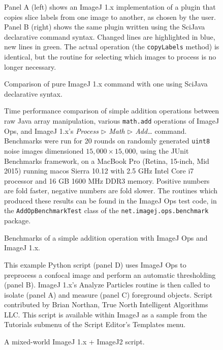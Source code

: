 \documentclass{bmcart}
\begin{document}
\begin{backmatter}
  \begin{figure}[h!]
    \caption{Comparison of pure ImageJ 1.x command with one using SciJava
    declarative syntax.}
    \begin{flushleft}
      Panel A (left) shows an ImageJ 1.x implementation of a plugin that copies
      slice labels from one image to another, as chosen by the user. Panel B
      (right) shows the same plugin written using the SciJava declarative
      command syntax. Changed lines are highlighted in blue, new lines in
      green. The actual operation (the \texttt{copyLabels} method) is
      identical, but the routine for selecting which images to process is no
      longer necessary.
    \end{flushleft}
  \end{figure}

  \begin{figure}[h!]
    \caption{Benchmarks of a simple addition operation with ImageJ Ops and
    ImageJ 1.x.}
    \begin{flushleft}
      Time performance comparison of simple addition operations between raw
      Java array manipulation, various \texttt{math.add} operations of ImageJ
      Ops, and ImageJ 1.x's \textit{Process $\triangleright$ Math
      $\triangleright$ Add\ldots} command. Benchmarks were run for 20 rounds on
      randomly generated \texttt{uint8} noise images dimensioned $15,000 \times
      15,000$, using the JUnit Benchmarks framework, on a MacBook Pro (Retina,
      15-inch, Mid 2015) running \acrshort{macos} Sierra 10.12 with 2.5 GHz
      Intel Core i7 processor and 16 GB 1600 MHz DDR3 memory. Positive numbers
      are fold faster, negative numbers are fold slower. The routines which
      produced these results can be found in the ImageJ Ops test code, in the
      \texttt{AddOpBenchmarkTest} class of the
      \texttt{net.imagej.ops.benchmark} package.
    \end{flushleft}
  \end{figure}

  \begin{figure}[h!]
    \caption{A mixed-world ImageJ 1.x + ImageJ2 script.}
    \begin{flushleft}
      This example Python script (panel D) uses ImageJ Ops to preprocess a
      confocal image and perform an automatic thresholding (panel B). ImageJ
      1.x's Analyze Particles routine is then called to isolate (panel A) and
      measure (panel C) foreground objects. Script contributed by Brian
      Northan, True North Intelligent Algorithms LLC. This script is available
      within ImageJ as a sample from the Tutorials submenu of the Script
      Editor's Templates menu.
    \end{flushleft}
  \end{figure}


\end{backmatter}
\end{document}

